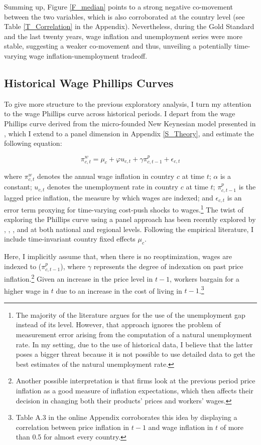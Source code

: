 \documentclass[12pt]{article}
\begin{document}
Summing up, Figure \ref{F_median} points to a strong negative co-movement between the two variables, which is also corroborated at the country level (see Table \ref{T_Correlation} in the Appendix). Nevertheless, during the Gold Standard and the last twenty years, wage inflation and unemployment series were more stable, suggesting a weaker co-movement and thus, unveiling a potentially time-varying wage inflation-unemployment tradeoff.

\subsection{Historical Wage Phillips Curves}

To give more structure to the previous exploratory analysis, I turn my attention to the wage Phillips curve across historical periods. I depart from the wage Phillips curve derived from the micro-founded New Keynesian model presented in \cite{Gali2011}, which I extend to a panel dimension in Appendix \ref{S_Theory}, and estimate the following equation:

\begin{equation} \label{EQ:Baseline}
    \pi_{c,t}^w = \mu_c + \varphi u_{c,t} + \gamma \pi_{c,t-1}^p + \epsilon_{c,t}
\end{equation}

where $\pi_{c,t}^w$ denotes the annual wage inflation in country $c$ at time $t$; $\alpha$ is a constant; $u_{c,t}$ denotes the unemployment rate in country $c$ at time $t$; $\pi_{c,t-1}^p$ is the lagged price inflation, the measure by which wages are indexed; and $\epsilon_{c,t}$ is an error term proxying for time-varying cost-push shocks to wages.\footnote{The majority of the literature argues for the use of the unemployment gap instead of its level. However, that approach ignores the problem of measurement error arising from the computation of a natural unemployment rate. In my setting, due to the use of historical data, I believe that the latter poses a bigger threat because it is not possible to use detailed data to get the best estimates of the natural unemployment rate.} The twist of exploring the Phillips curve using a panel approach has been recently explored by \cite{Coibion2019}, \cite{Levy2019}, \cite{DeSchryder2020}, and \cite{Hazell2021} at both national and regional levels. Following the empirical literature, I include time-invariant country fixed effects $\mu_c$. %

Here, I implicitly assume that, when there is no reoptimization, wages are indexed to ($\pi_{c,t-1}^p$), where $\gamma$ represents the degree of indexation on past price inflation.\footnote{Another possible interpretation is that firms look at the previous period price inflation as a good measure of inflation expectations, which then affects their decision in changing both their products' prices and workers' wages.} Given an increase in the price level in $t-1$, workers bargain for a higher wage in $t$ due to an increase in the cost of living in $t-1$.\footnote{Table A.3 in the online Appendix corroborates this idea by displaying a correlation between price inflation in $t-1$ and wage inflation in $t$ of more than 0.5 for almost every country.}
\end{document}
